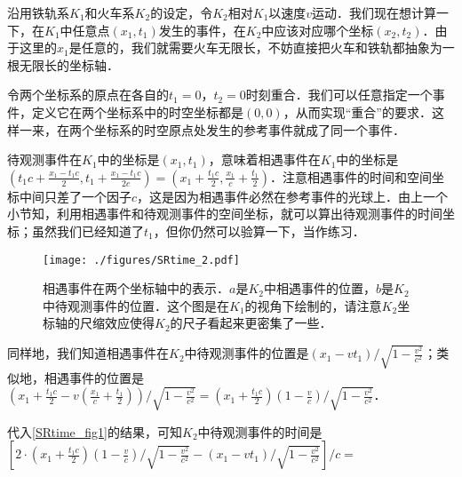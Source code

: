 沿用铁轨系$K_1$和火车系$K_2$的设定，令$K_2$相对$K_1$以速度$v$运动．我们现在想计算一下，在$K_1$中任意点$(x_1,t_1)$发生的事件，在$K_2$中应该对应哪个坐标$(x_2,t_2)$．由于这里的$x_1$是任意的，我们就需要火车无限长，不妨直接把火车和铁轨都抽象为一根无限长的坐标轴．

令两个坐标系的原点在各自的$t_1=0$，$t_2=0$时刻重合．我们可以任意指定一个事件，定义它在两个坐标系中的时空坐标都是$(0,0)$，从而实现“重合”的要求．这样一来，在两个坐标系的时空原点处发生的参考事件就成了同一个事件．

待观测事件在$K_1$中的坐标是$(x_1, t_1)$，意味着相遇事件在$K_1$中的坐标是$(t_1c+\frac{x_1-t_1c}{2}, t_1+\frac{x_1-t_1c}{2c})=(x_1+\frac{t_1c}{2},\frac{x_1}{c}+\frac{t_1}{2})$．注意相遇事件的时间和空间坐标中间只差了一个因子$c$，这是因为相遇事件必然在参考事件的光球上．由上一个小节知，利用相遇事件和待观测事件的空间坐标，就可以算出待观测事件的时间坐标；虽然我们已经知道了$t_1$，但你仍然可以验算一下，当作练习．

\begin{figure}[ht]
\centering
\texttt{[image: ./figures/SRtime\_2.pdf]}
\caption{相遇事件在两个坐标轴中的表示．$a$是$K_2$中相遇事件的位置，$b$是$K_2$中待观测事件的位置．这个图是在$K_1$的视角下绘制的，请注意$K_2$坐标轴的尺缩效应使得$K_2$的尺子看起来更密集了一些．} \label{SRtime_fig2}
\end{figure}

同样地，我们知道相遇事件在$K_2$中待观测事件的位置是$(x_1-vt_1)/\sqrt{1-\frac{v^2}{c^2}}$；类似地，相遇事件的位置是$(x_1+\frac{t_1c}{2}-v(\frac{x_1}{c}+\frac{t_1}{2}))/\sqrt{1-\frac{v^2}{c^2}}=(x_1+\frac{t_1c}{2})(1-\frac{v}{c})/\sqrt{1-\frac{v^2}{c^2}}$．

代入\autoref{SRtime_fig1}的结果，可知$K_2$中待观测事件的时间是$[2\cdot(x_1+\frac{t_1c}{2})(1-\frac{v}{c})/\sqrt{1-\frac{v^2}{c^2}}-(x_1-vt_1)/\sqrt{1-\frac{v^2}{c^2}}]/c=$
